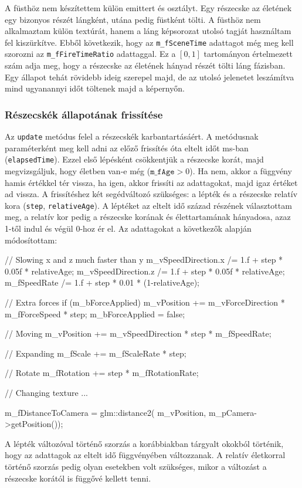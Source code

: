 A füsthöz nem készítettem külön emittert és osztályt. Egy részecske az életének egy bizonyos részét lángként, utána pedig füstként tölti. A füsthöz nem alkalmaztam külön textúrát, hanem a láng képsorozat utolsó tagját használtam fel kiszürkítve. Ebből következik, hogy az \texttt{m\_fSceneTime} adattagot még meg kell szorozni az \texttt{m\_fFireTimeRatio} adattaggal. Ez a $[0, 1]$ tartományon értelmezett szám adja meg, hogy a részecske az életének hányad részét tölti láng fázisban. Egy állapot tehát rövidebb ideig szerepel majd, de az utolsó jelenetet leszámítva mind ugyanannyi időt töltenek majd a képernyőn. 

\subsubsection{Részecskék állapotának frissítése}
Az \texttt{update} metódus felel a részecskék karbantartásáért. A metódusnak paraméterként meg kell adni az előző frissítés óta eltelt időt ms-ban (\texttt{elapsedTime}). Ezzel első lépésként csökkentjük a részecske korát, majd megvizsgáljuk, hogy életben van-e még ($\texttt{m\_fAge} > 0$). Ha nem, akkor a függvény hamis értékkel tér vissza, ha igen, akkor frissíti az adattagokat, majd igaz értéket ad vissza. A frissítéshez két segédváltozó szükséges: a lépték és a részecske relatív kora (\texttt{step}, \texttt{relativeAge}). A léptéket az eltelt idő század részének választottam meg, a relatív kor pedig a részecske korának és élettartamának hányadosa, azaz 1-től indul és végül 0-hoz ér el. Az adattagokat a következők alapján módosítottam: 
\begin{cpp}
// Slowing x and z much faster than y
m_vSpeedDirection.x /= 1.f + step * 0.05f * relativeAge;
m_vSpeedDirection.z /= 1.f + step * 0.05f * relativeAge;
m_fSpeedRate /= 1.f + step * 0.01 * (1-relativeAge);

// Extra forces
if (m_bForceApplied)
{
	m_vPosition += m_vForceDirection * m_fForceSpeed * step;
	m_bForceApplied = false;
}

// Moving
m_vPosition += m_vSpeedDirection * step * m_fSpeedRate;

// Expanding
m_fScale += m_fScaleRate * step;

// Rotate
m_fRotation += step * m_fRotationRate;

// Changing texture
{...}

m_fDistanceToCamera = glm::distance2(
		m_vPosition, m_pCamera->getPosition());
\end{cpp}
A lépték változóval történő szorzás a korábbiakban tárgyalt okokból történik, hogy az adattagok az eltelt idő függvényében változzanak. A relatív életkorral történő szorzás pedig olyan esetekben volt szükséges, mikor a változást a részecske korától is függővé kellett tenni.

